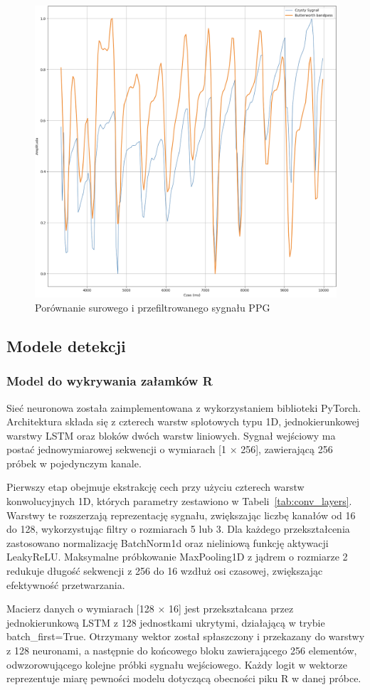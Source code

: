 \documentclass[journal]{IEEEtran}
\begin{document}
\begin{figure}[htbp]
    \centering
    \includegraphics[width=0.76\linewidth]{Filtr_PPG.png} 
    \caption{Porównanie surowego i przefiltrowanego sygnału PPG}
    \label{fig:filtr_ppg}
\end{figure}

\newpage
\subsection{Modele detekcji}
\subsubsection{Model do wykrywania załamków R}
Sieć neuronowa została zaimplementowana z wykorzystaniem biblioteki PyTorch. Architektura składa się z czterech warstw splotowych typu 1D, jednokierunkowej warstwy LSTM oraz bloków dwóch warstw liniowych. Sygnał wejściowy ma postać jednowymiarowej sekwencji o wymiarach [1 × 256], zawierającą 256 próbek w pojedynczym kanale.

Pierwszy etap obejmuje ekstrakcję cech przy użyciu czterech warstw konwolucyjnych 1D, których parametry zestawiono w Tabeli~\ref{tab:conv_layers}. Warstwy te rozszerzają reprezentację sygnału, zwiększając liczbę kanałów od 16 do 128, wykorzystując filtry o rozmiarach 5 lub 3. Dla każdego przekształcenia zastosowano normalizację BatchNorm1d oraz nieliniową funkcję aktywacji LeakyReLU. Maksymalne próbkowanie MaxPooling1D z jądrem o rozmiarze 2 redukuje długość sekwencji z 256 do 16 wzdłuż osi czasowej, zwiększając efektywność przetwarzania.

Macierz danych o wymiarach [128 × 16] jest przekształcana przez jednokierunkową LSTM z 128 jednostkami ukrytymi, działającą w trybie batch\_first=True. Otrzymany wektor został spłaszczony i przekazany do warstwy z 128 neuronami, a następnie do końcowego bloku zawierającego 256 elementów, odwzorowującego kolejne próbki sygnału wejściowego. Każdy logit w wektorze reprezentuje miarę pewności modelu dotyczącą obecności piku R w danej próbce.
\end{document}

